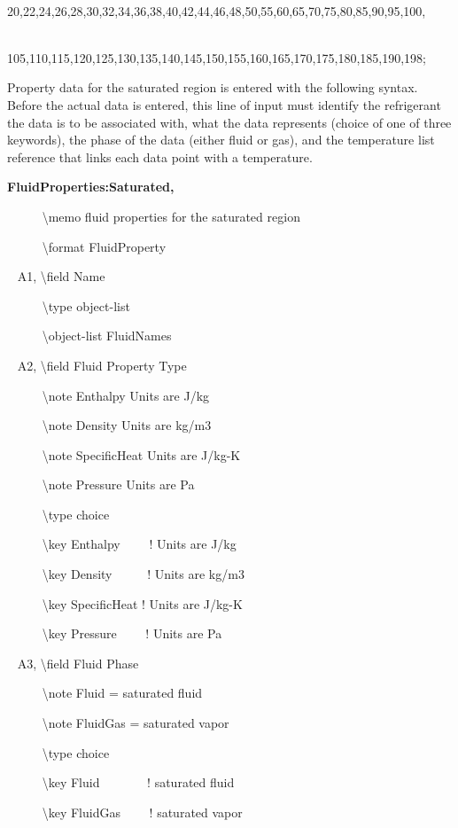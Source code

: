~~~~~ 20,22,24,26,28,30,32,34,36,38,40,42,44,46,48,50,55,60,65,70,75,80,85,90,95,100,

~~~~~ 105,110,115,120,125,130,135,140,145,150,155,160,165,170,175,180,185,190,198;

Property data for the saturated region is entered with the following syntax.~ Before the actual data is entered, this line of input must identify the refrigerant the data is to be associated with, what the data represents (choice of one of three keywords), the phase of the data (either fluid or gas), and the temperature list reference that links each data point with a temperature.

\textbf{FluidProperties:Saturated,}

~~~~~ \textbackslash{}memo fluid properties for the saturated region

~~~~~ \textbackslash{}format FluidProperty

~ A1, \textbackslash{}field Name

~~~~~ \textbackslash{}type object-list

~~~~~ \textbackslash{}object-list FluidNames

~ A2, \textbackslash{}field Fluid Property Type

~~~~~ \textbackslash{}note Enthalpy Units are J/kg

~~~~~ \textbackslash{}note Density Units are kg/m3

~~~~~ \textbackslash{}note SpecificHeat Units are J/kg-K

~~~~~ \textbackslash{}note Pressure Units are Pa

~~~~~ \textbackslash{}type choice

~~~~~ \textbackslash{}key Enthalpy~~~~ ! Units are J/kg

~~~~~ \textbackslash{}key Density~~~~~ ! Units are kg/m3

~~~~~ \textbackslash{}key SpecificHeat ! Units are J/kg-K

~~~~~ \textbackslash{}key Pressure~~~~ ! Units are Pa

~ A3, \textbackslash{}field Fluid Phase

~~~~~ \textbackslash{}note Fluid = saturated fluid

~~~~~ \textbackslash{}note FluidGas = saturated vapor

~~~~~ \textbackslash{}type choice

~~~~~ \textbackslash{}key Fluid ~~~~~~~! saturated fluid

~~~~~ \textbackslash{}key FluidGas~~~~ ! saturated vapor

